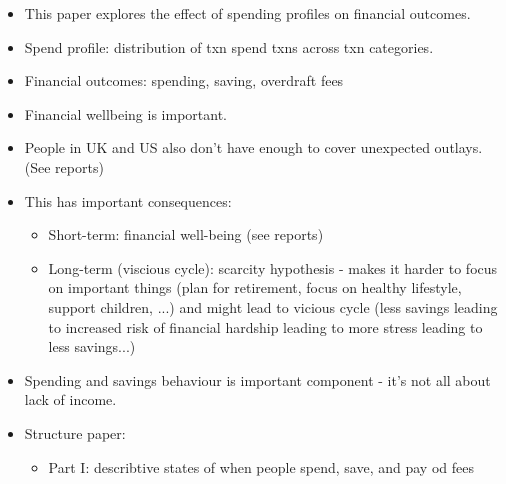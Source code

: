 

\begin{itemize}


    \item This paper explores the effect of spending profiles on financial
        outcomes.

    \item Spend profile: distribution of txn spend txns across txn categories.

    \item Financial outcomes: spending, saving, overdraft fees


    \item Financial wellbeing is important.

    \item People in UK and US also don't have enough to cover unexpected
        outlays. (See reports)

    \item This has important consequences:

        \begin{itemize}

            \item Short-term: financial well-being (see reports)

            \item Long-term (viscious cycle): scarcity hypothesis - makes it
                harder to focus on important things (plan for retirement, focus
                on healthy lifestyle, support children, ...) and might lead to
                vicious cycle (less savings leading to increased risk of
                financial hardship leading to more stress leading to less
                savings...)

        \end{itemize}

    \item Spending and savings behaviour is important component - it's not all
        about lack of income.

    \item Structure paper:

        \begin{itemize}

            \item Part I: describtive states of when people spend, save, and pay od fees


\end{itemize}
\end{itemize}
